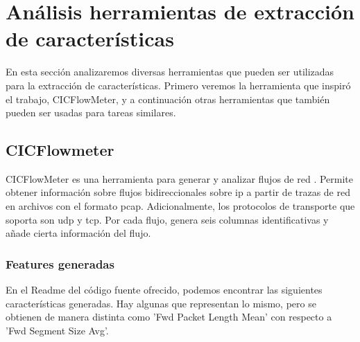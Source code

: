 \section{Análisis herramientas de extracción de características}

En esta sección analizaremos diversas herramientas que pueden ser utilizadas para la extracción de características. Primero veremos la herramienta que inspiró el trabajo, CICFlowMeter, y a continuación otras herramientas que también pueden ser usadas para tareas similares.

\subsection{CICFlowmeter}

CICFlowMeter es una herramienta para generar y analizar flujos de red \cite{cicflowpost} \cite{icissp17} \cite{cicflowrepo}. Permite obtener información sobre flujos bidireccionales sobre \acrshort{ip} a partir de trazas de red en archivos con el formato pcap. Adicionalmente, los protocolos de transporte que soporta son \acrshort{udp} y \acrshort{tcp}. Por cada flujo, genera seis columnas identificativas y añade cierta información del flujo. 

\subsubsection{Features generadas} \label{cicflowfeatures}

En el Readme del código fuente ofrecido, podemos encontrar las siguientes características generadas. Hay algunas que representan lo mismo, pero se obtienen de manera distinta como 'Fwd Packet Length Mean' con respecto a 'Fwd Segment Size Avg'.


